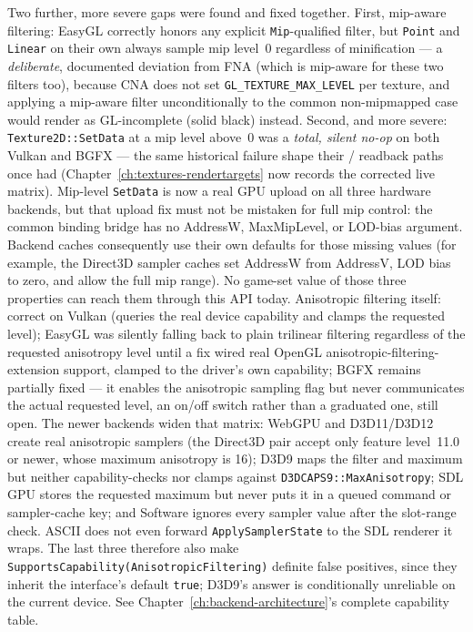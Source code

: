 Two further, more severe gaps were found and fixed together. First, mip-aware filtering:
EasyGL correctly honors any explicit \texttt{Mip}-qualified filter, but \texttt{Point} and
\texttt{Linear} on their own always sample mip level~0 regardless of minification --- a
\emph{deliberate}, documented deviation from FNA (which is mip-aware for these two filters
too), because CNA does not set \texttt{GL\_TEXTURE\_MAX\_LEVEL} per texture, and applying a
mip-aware filter unconditionally to the common non-mipmapped case would render as GL-incomplete
(solid black) instead. Second, and more severe: \texttt{Texture2D::SetData} at a mip level
above~0 was a \emph{total, silent no-op} on both Vulkan and BGFX --- the same historical
failure shape their  /  readback paths once had
(Chapter~\ref{ch:textures-rendertargets} now records the corrected live matrix). Mip-level
\texttt{SetData} is now a real GPU upload on all three hardware backends, but that upload fix
must not be mistaken for full  mip control: the common binding bridge has
no AddressW, MaxMipLevel, or LOD-bias argument. Backend caches consequently use their own
defaults for those missing values (for example, the Direct3D sampler caches set AddressW from
AddressV, LOD bias to zero, and allow the full mip range). No game-set value of those three
properties can reach them through this API today.
Anisotropic filtering itself: correct on Vulkan (queries the real device capability and
clamps the requested level); EasyGL was silently falling back to plain trilinear filtering
regardless of the requested anisotropy level until a fix wired real
OpenGL anisotropic-filtering-extension support, clamped to the driver's own capability;
BGFX remains partially fixed --- it enables the anisotropic sampling flag but
never communicates the actual requested level, an on/off switch rather than a graduated one,
still open. The newer backends widen that matrix: WebGPU and D3D11/D3D12 create real
anisotropic samplers (the Direct3D pair accept only feature level~11.0 or newer, whose maximum
anisotropy is 16); D3D9 maps the filter and maximum but neither capability-checks nor clamps
against \texttt{D3DCAPS9::MaxAnisotropy}; SDL GPU stores the requested maximum but never puts it
in a queued command or sampler-cache key; and Software ignores every sampler value after the
slot-range check. ASCII does not even forward \texttt{ApplySamplerState} to the SDL renderer it
wraps. The last three therefore also make
\texttt{SupportsCapability(AnisotropicFiltering)} definite false positives, since they inherit
the interface's default \texttt{true}; D3D9's answer is conditionally unreliable on the current
device. See Chapter~\ref{ch:backend-architecture}'s complete capability table.

